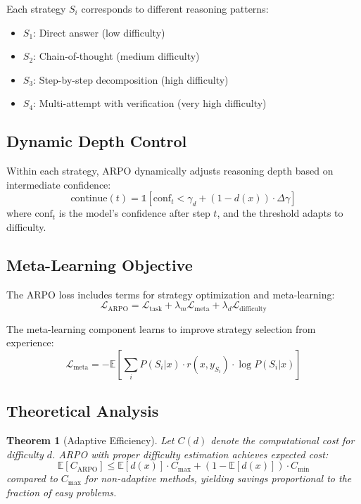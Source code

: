 \documentclass[11pt,a4paper]{article}
\newtheorem{theorem}{Theorem}[section]
\newcommand{\E}{\mathbb{E}}
\begin{document}
Each strategy $S_i$ corresponds to different reasoning patterns:
\begin{itemize}
    \item $S_1$: Direct answer (low difficulty)
    \item $S_2$: Chain-of-thought (medium difficulty)
    \item $S_3$: Step-by-step decomposition (high difficulty)
    \item $S_4$: Multi-attempt with verification (very high difficulty)
\end{itemize}

\subsection{Dynamic Depth Control}

Within each strategy, ARPO dynamically adjusts reasoning depth based on intermediate confidence:
\begin{equation}
    \text{continue}(t) = \mathbb{1}[\text{conf}_t < \gamma_d + (1 - d(x)) \cdot \Delta\gamma]
\end{equation}
where $\text{conf}_t$ is the model's confidence after step $t$, and the threshold adapts to difficulty.

\subsection{Meta-Learning Objective}

The ARPO loss includes terms for strategy optimization and meta-learning:
\begin{equation}
    \mathcal{L}_{\text{ARPO}} = \mathcal{L}_{\text{task}} + \lambda_m \mathcal{L}_{\text{meta}} + \lambda_d \mathcal{L}_{\text{difficulty}}
\end{equation}

The meta-learning component learns to improve strategy selection from experience:
\begin{equation}
    \mathcal{L}_{\text{meta}} = -\E\left[\sum_i P(S_i|x) \cdot r(x, y_{S_i}) \cdot \log P(S_i|x)\right]
\end{equation}

\subsection{Theoretical Analysis}

\begin{theorem}[Adaptive Efficiency]
Let $C(d)$ denote the computational cost for difficulty $d$. ARPO with proper difficulty estimation achieves expected cost:
\begin{equation}
    \E[C_{\text{ARPO}}] \leq \E[d(x)] \cdot C_{\max} + (1 - \E[d(x)]) \cdot C_{\min}
\end{equation}
compared to $C_{\max}$ for non-adaptive methods, yielding savings proportional to the fraction of easy problems.
\end{theorem}
\end{document}
